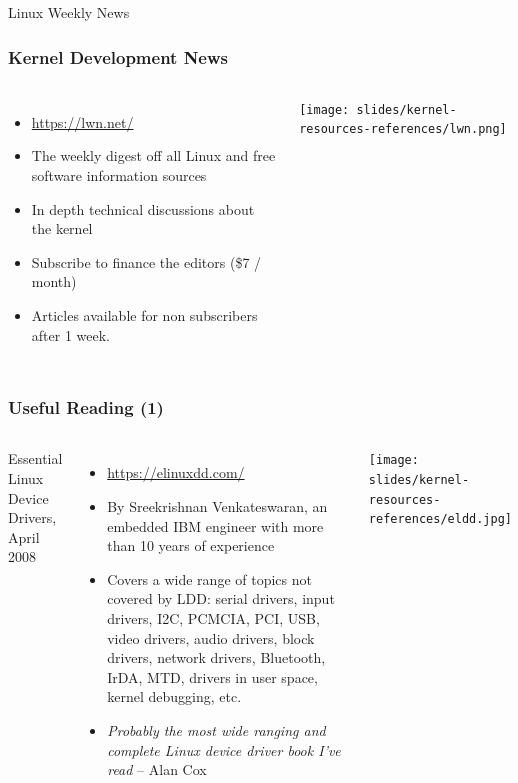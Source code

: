\begin{frame}
  Linux Weekly News
  \frametitle{Kernel Development News}
  \begin{columns}
    \begin{itemize}
    \item \url{https://lwn.net/}
    \item The weekly digest off all Linux and free software
      information sources
    \item In depth technical discussions about the kernel
    \item Subscribe to finance the editors (\$7 / month)
    \item Articles available for non subscribers after 1 week.
    \end{itemize}
    \texttt{[image: slides/kernel-resources-references/lwn.png]}
  \end{columns}
\end{frame}

\begin{frame}
  \frametitle{Useful Reading (1)}
  \begin{columns}
    Essential Linux Device Drivers, April 2008
    \begin{itemize}
    \item \url{https://elinuxdd.com/}
    \item By Sreekrishnan Venkateswaran, an embedded IBM engineer
      with more than 10 years of experience
    \item Covers a wide range of topics not covered by LDD: serial
      drivers, input drivers, I2C, PCMCIA, PCI,
      USB, video drivers, audio drivers, block drivers, network
      drivers, Bluetooth, IrDA, MTD, drivers in user space, kernel
      debugging, etc.
    \item \emph{Probably the most wide ranging and complete Linux
          device driver book I've read} -- Alan Cox
    \end{itemize}
    \texttt{[image: slides/kernel-resources-references/eldd.jpg]}
  \end{columns}
\end{frame}

